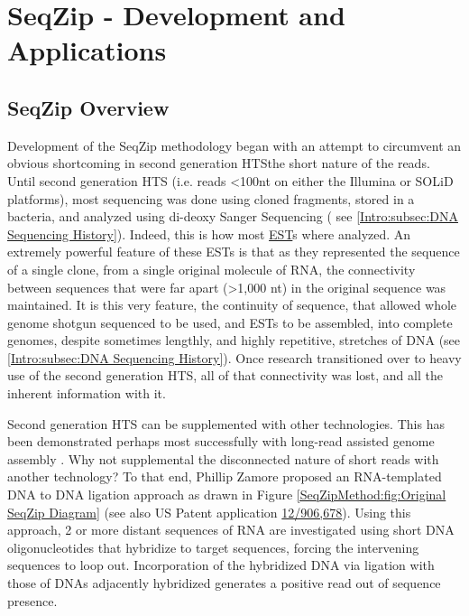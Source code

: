 \chapter{SeqZip - Development and Applications} \label{SeqZipMethod} 
\section{SeqZip Overview}\label{SeqZipMethod:sec:SeqZip Overview}

  Development of the SeqZip methodology began with an attempt to circumvent an obvious shortcoming in second generation HTS\textemdash the short nature of the reads. Until second generation HTS (i.e. reads <100nt on either the Illumina or SOLiD platforms), most sequencing was done using cloned fragments, stored in a bacteria, and analyzed using di-deoxy Sanger Sequencing ( see \ref{Intro:subsec:DNA Sequencing History}). Indeed, this is how most \hyperref[hd:abrevs]{EST}s where analyzed. An extremely powerful feature of these ESTs is that as they represented the sequence of a single clone, from a single original molecule of RNA, the connectivity between sequences that were far apart (>1,000 nt) in the original sequence was maintained. It is this very feature, the continuity of sequence, that allowed whole genome shotgun sequenced to be used, and ESTs to be assembled, into complete genomes, despite sometimes lengthly, and highly repetitive, stretches of DNA (see \ref{Intro:subsec:DNA Sequencing History}). Once research transitioned over to heavy use of the second generation HTS, all of that connectivity was lost, and all the inherent information with it.

  Second generation HTS can be supplemented with other technologies. This has been demonstrated perhaps most successfully with long-read assisted genome assembly \citep{Koren2012a}. Why not supplemental the disconnected nature of short reads with another technology? To that end, Phillip Zamore proposed an RNA-templated DNA to DNA ligation approach as drawn in Figure \ref{SeqZipMethod:fig:Original SeqZip Diagram} (see also US Patent application \href{http://1.usa.gov/PTG9BB}{12/906,678}). Using this approach, 2 or more distant sequences of RNA are investigated using short DNA oligonucleotides that hybridize to target sequences, forcing the intervening sequences to loop out. Incorporation of the hybridized DNA via ligation with those of DNAs adjacently hybridized generates a positive read out of sequence presence.


